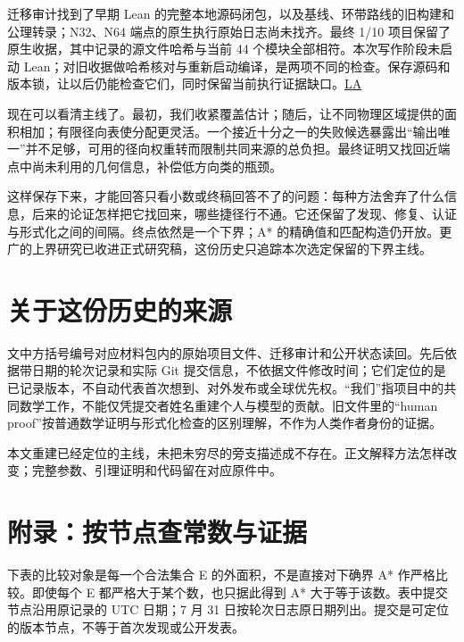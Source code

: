 迁移审计找到了早期 Lean 的完整本地源码闭包，以及基线、环带路线的旧构建和公理转录；N32、N64 端点的原生执行原始日志尚未找齐。最终 1/10 项目保留了原生收据，其中记录的源文件哈希与当前 44 个模块全部相符。本次写作阶段未启动 Lean；对旧收据做哈希核对与重新启动编译，是两项不同的检查。保存源码和版本锁，让以后仍能检查它们，同时保留当前执行证据缺口。\href{https://github.com/subfish-zhou/star-shaped-kakeya-lean/blob/6432d8eb33cc2093ed5ca1f5e63390e4bf065fd0/audits/historical-lean-audit.md}{LA}

现在可以看清主线了。最初，我们收紧覆盖估计；随后，让不同物理区域提供的面积相加；有限径向表使分配更灵活。一个接近十分之一的失败候选暴露出``输出唯一''并不足够，可用的径向权重转而限制共同来源的总负担。最终证明又找回近端点中尚未利用的几何信息，补偿低方向类的瓶颈。

这样保存下来，才能回答只看小数或终稿回答不了的问题：每种方法舍弃了什么信息，后来的论证怎样把它找回来，哪些捷径行不通。它还保留了发现、修复、认证与形式化之间的间隔。终点依然是一个下界；A* 的精确值和匹配构造仍开放。更广的上界研究已收进正式研究稿，这份历史只追踪本次选定保留的下界主线。

\section{关于这份历史的来源}\label{ux5173ux4e8eux8fd9ux4efdux5386ux53f2ux7684ux6765ux6e90}

文中方括号编号对应材料包内的原始项目文件、迁移审计和公开状态读回。先后依据带日期的轮次记录和实际 Git 提交信息，不依据文件修改时间；它们定位的是已记录版本，不自动代表首次想到、对外发布或全球优先权。``我们''指项目中的共同数学工作，不能仅凭提交者姓名重建个人与模型的贡献。旧文件里的``human proof''按普通数学证明与形式化检查的区别理解，不作为人类作者身份的证据。

本文重建已经定位的主线，未把未穷尽的旁支描述成不存在。正文解释方法怎样改变；完整参数、引理证明和代码留在对应原件中。

\section{附录：按节点查常数与证据}\label{ux9644ux5f55ux6309ux8282ux70b9ux67e5ux5e38ux6570ux4e0eux8bc1ux636e}

下表的比较对象是每一个合法集合 E 的外面积，不是直接对下确界 A* 作严格比较。即使每个 E 都严格大于某个数，也只据此得到 A* 大于等于该数。表中提交节点沿用原记录的 UTC 日期；7 月 31 日按轮次日志原日期列出。提交是可定位的版本节点，不等于首次发现或公开发表。

